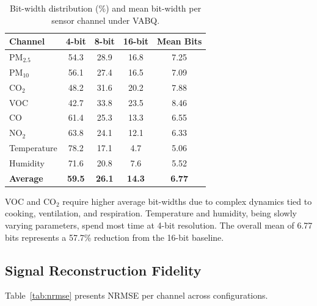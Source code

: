 \begin{table}[H]
\centering
\caption{Bit-width distribution (\%) and mean bit-width per sensor channel under VABQ.}
\label{tab:bitwidth}
\begin{tabular}{@{}lcccc@{}}
\toprule
\textbf{Channel} & \textbf{4-bit} & \textbf{8-bit} & \textbf{16-bit} & \textbf{Mean Bits} \\
\midrule
PM$_{2.5}$     & 54.3 & 28.9 & 16.8 & 7.25 \\
PM$_{10}$      & 56.1 & 27.4 & 16.5 & 7.09 \\
CO$_2$         & 48.2 & 31.6 & 20.2 & 7.88 \\
VOC            & 42.7 & 33.8 & 23.5 & 8.46 \\
CO             & 61.4 & 25.3 & 13.3 & 6.55 \\
NO$_2$         & 63.8 & 24.1 & 12.1 & 6.33 \\
Temperature    & 78.2 & 17.1 &  4.7 & 5.06 \\
Humidity       & 71.6 & 20.8 &  7.6 & 5.52 \\
\midrule
\textbf{Average} & \textbf{59.5} & \textbf{26.1} & \textbf{14.3} & \textbf{6.77} \\
\bottomrule
\end{tabular}
\end{table}

VOC and CO$_2$ require higher average bit-widths due to complex dynamics tied to cooking, ventilation, and respiration. Temperature and humidity, being slowly varying parameters, spend most time at 4-bit resolution. The overall mean of 6.77 bits represents a 57.7\% reduction from the 16-bit baseline.

\subsection{Signal Reconstruction Fidelity}
\label{sec:res_nrmse}

Table~\ref{tab:nrmse} presents NRMSE per channel across configurations.

